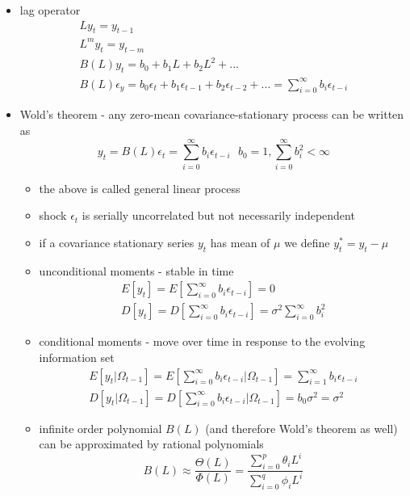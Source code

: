 \begin{itemize}
\begin{itemize}
\end{itemize}
\item lag operator
\begin{gather*}
L y_t = y_{t-1}\\
L^m y_t = y_{t-m}\\
B(L) y_t = b_0 + b_1L + b_2L^2 + ...\\
B(L)\epsilon_y = b_0 \epsilon_t + b_1 \epsilon_{t-1} + b_2 \epsilon_{t-2} + ... = \sum_{i = 0}^{\infty} b_i \epsilon_{t-i}
\end{gather*}
\item Wold's theorem - any zero-mean covariance-stationary process can be written as
\begin{equation*}
y_t = B(L)\epsilon_t = \sum_{i = 0} ^ {\infty} b_i \epsilon_{t-i} ~~~b_0 = 1, \sum_{i = 0}^{\infty} b_i^2 < \infty
\end{equation*}
\begin{itemize}
\item the above is called general linear process
\item shock $\epsilon_t$ is serially uncorrelated but not necessarily independent
\item if a covariance stationary series $y_t$ has mean of $\mu$ we define $y_t^* = y_t - \mu$
\item unconditional moments - stable in time
\begin{gather*}
E[y_t] = E\left[\sum_{i = 0}^{\infty} b_i \epsilon_{t-i}\right] = 0\\
D[y_t] = D\left[\sum_{i = 0}^{\infty} b_i \epsilon_{t-i}\right] = \sigma^2 \sum_{i = 0}^{\infty}b_i^2
\end{gather*}
\item conditional moments - move over time in response to the evolving information set
\begin{gather*}
E[y_t|\Omega_{t-1}]= E\left[\sum_{i = 0}^{\infty} b_i \epsilon_{t-i} | \Omega_{t-1}\right] = \sum_{i = 1}^{\infty} b_i \epsilon_{t-i}\\
D[y_t|\Omega_{t-1}]= D\left[\sum_{i = 0}^{\infty} b_i \epsilon_{t-i} | \Omega_{t-1}\right] = b_0 \sigma^2 = \sigma^2
\end{gather*}
\item infinite order polynomial $B(L)$ (and therefore Wold's theorem as well) can be approximated by rational polynomials
\begin{equation*}
B(L)  \approx \frac{\Theta(L)}{\Phi(L)} = \frac{\sum_{i = 0}^p \theta_i L^i}{\sum_{i = 0}^q \phi_i L^i}
\end{equation*}

\end{itemize}
\end{itemize}
